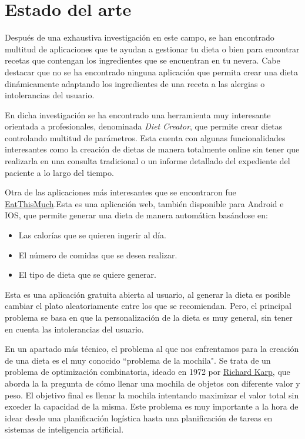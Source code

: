 \chapter{Estado del arte}
Después de una exhaustiva investigación en este campo, se han encontrado multitud de aplicaciones que te ayudan a gestionar tu dieta o bien para encontrar recetas que contengan los ingredientes que se encuentran en tu nevera. Cabe destacar que no se ha encontrado ninguna aplicación que permita crear una dieta dinámicamente adaptando los ingredientes de una receta a las alergias o intolerancias del usuario.

En dicha investigación se ha encontrado una herramienta muy interesante orientada a profesionales, denominada \emph{Diet Creator}, que permite crear dietas controlando multitud de parámetros. Esta cuenta con algunas funcionalidades interesantes como la creación de dietas de manera totalmente online sin tener que realizarla en una consulta tradicional o un informe detallado del expediente del paciente a lo largo del tiempo.

Otra de las aplicaciones más interesantes que se encontraron fue \href{https://www.eatthismuch.com/}{EatThisMuch}.Esta es una aplicación web, también disponible para Android e IOS, que permite generar una dieta de manera automática basándose en:
\begin{itemize}
    \item Las calorías que se quieren ingerir al día.
    \item El número de comidas que se desea realizar.
    \item El tipo de dieta que se quiere generar.
\end{itemize}
Esta es una aplicación gratuita abierta al usuario, al generar la dieta es posible cambiar el plato aleatoriamente entre los que se recomiendan. Pero, el principal problema se basa en que la personalización de la dieta es muy general, sin tener en cuenta las intolerancias del usuario.

En un apartado más técnico, el problema al que nos enfrentamos para la creación de una dieta es el muy conocido ``problema de la mochila"\cite{mochila}. Se trata de un problema de optimización combinatoria, ideado en 1972 por \href{https://es.wikipedia.org/wiki/Richard_Karp}{Richard Karp}, que aborda la la pregunta de cómo llenar una mochila de objetos con diferente valor y peso. El objetivo final es llenar la mochila intentando maximizar el valor total sin exceder la capacidad de la misma. Este problema es muy importante a la hora de idear desde una planificación logística hasta una planificación de tareas en sistemas de inteligencia artificial. 

